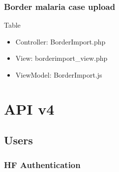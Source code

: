 \documentclass[letterpaper,10pt,english,openany,oneside]{sphinxmanual}
\begin{document}
\subsection{Border malaria case upload}
\label{\detokenize{module/module:border-malaria-case-upload}}
\sphinxAtStartPar
Table

\begin{sphinxVerbatim}[commandchars=\\\{\}]
                
  
                
\end{sphinxVerbatim}
\begin{itemize}
\item {} 
\sphinxAtStartPar
Controller: BorderImport.php

\item {} 
\sphinxAtStartPar
View: borderimport\_view.php

\item {} 
\sphinxAtStartPar
ViewModel: BorderImport.js

\end{itemize}


\chapter{API v4}
\label{\detokenize{api/v4:api-v4}}\label{\detokenize{api/v4::doc}}

\section{Users}
\label{\detokenize{api/v4:users}}

\subsection{HF Authentication}
\label{\detokenize{api/v4:hf-authentication}}
\end{document}
